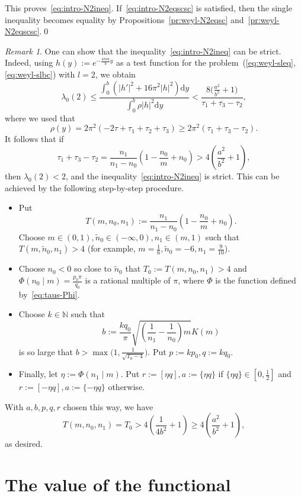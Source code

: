 \documentclass{amsart}
\let\le\leqslant
\let\ge\geqslant
\renewcommand{\d}{\mathrm{d}}
\theoremstyle{plain}
\theoremstyle{definition}
\theoremstyle{remark}
\newtheorem{remark}{Remark}[section]
\begin{document}
This proves~\eqref{eq:intro-N2ineq}. If~\eqref{eq:intro-N2eqscsc} is satisfied,
then the single inequality becomes equality by Propositions~\ref{pr:weyl-N2eqsc}
and~\ref{pr:weyl-N2eqscsc}.\qed
\begin{remark}\label{rem:weyl-N2noteq}
One can show that the inequality~\eqref{eq:intro-N2ineq} can be strict. Indeed,
using \(h(y):=e^{-\frac{4\pi ia}b y}\) as a test function for the
problem~(\ref{eq:weyl-sleq},\ref{eq:weyl-slbc}) with \(l=2\), we obtain
\[
\lambda_0(2)\le
\frac{\int_0^b (|h'|^2+16\pi^2 |h|^2)\d y}{\int_0^b\rho|h|^2\d y}<
\frac{8\bigl(\frac{a^2}{b^2}+1\bigr)}{\tau_1+\tau_3-\tau_2},
\]
where we used that
\[
\rho(y)=2\pi^2(-2\tau+\tau_1+\tau_2+\tau_3)\ge 2\pi^2(\tau_1+\tau_3-\tau_2).
\]
It follows that if
\[
\tau_1+\tau_3-\tau_2=\frac{n_1}{n_1-n_0}\left(1-\frac{n_0}m+n_0\right)>
4\left(\frac{a^2}{b^2}+1\right),
\]
then \(\lambda_0(2)<2\), and the inequality~\eqref{eq:intro-N2ineq} is strict.
This can be achieved by the following step-by-step procedure.
\begin{itemize}
\item
Put
\[
T(m,n_0,n_1):=\frac{n_1}{n_1-n_0}\left(1-\frac{n_0}m+n_0\right).
\]
Choose \(m\in (0,1),\tilde n_0\in (-\infty,0),n_1\in (m,1)\) such that
\(T(m,\tilde n_0,n_1)>4\) (for example, \(m=\frac{1}6,\tilde
n_0=-6,n_1=\frac{9}{10}\)).

\item
Choose \(n_0<0\) so close to \(\tilde n_0\) that \(T_0:=T(m,n_0,n_1)>4\) and
\(\Phi(n_0\mid m)=\frac{p_0\pi}{q_0}\) is a rational multiple of \(\pi\), where
\(\Phi\) is the function defined by~\eqref{eq:taus-Phi}.

\item 
Choose \(k\in\mathbb N\) such that
\[
b:=\frac{kq_0}\pi\sqrt{\left(\frac{1}{n_1}-\frac{1}{n_0}\right)m}K(m)
\]
is so large that \(b>\max\bigl(1,\frac{1}{\sqrt{T_0-4}}\bigr)\). Put
\(p:=kp_0,q:=kq_0\).

\item
Finally, let \(\eta:=\Phi(n_1\mid m)\). Put \(r:=[\eta q],a:=\{\eta q\}\) if
\(\{\eta q\}\in\left[0,\frac{1}2\right]\) and \(r:=[-\eta q],a:=\{-\eta q\}\)
otherwise.
\end{itemize}
With \(a,b,p,q,r\) chosen this way, we have
\[
T(m,n_0,n_1)=T_0>4\left(\frac{1}{4b^2}+1\right)\ge
4\left(\frac{a^2}{b^2}+1\right),
\]
as desired.
\end{remark}

\section{The value of the functional}\label{sec:barlval}
\end{document}
